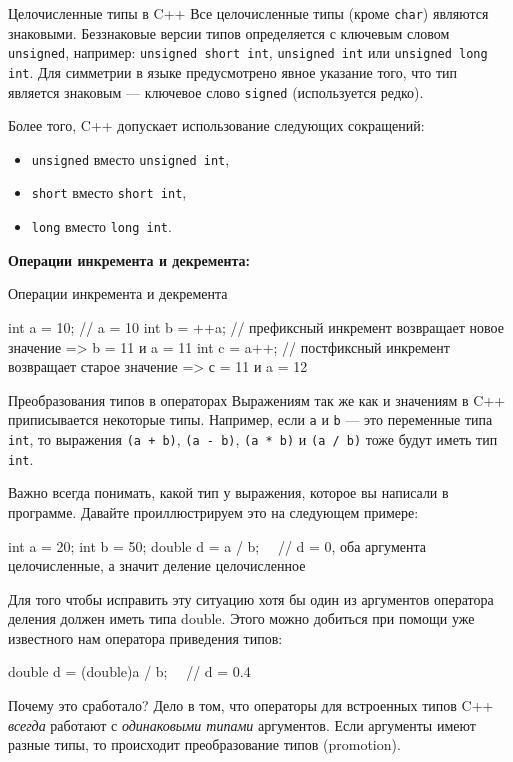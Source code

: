\documentclass[
    9pt,
    hyperref={pdfencoding=unicode}
    ]{beamer}
\begin{document}
\begin{frame}{Целочисленные типы в C++}
    Все целочисленные типы (кроме \texttt{char}) являются знаковыми. Беззнаковые версии типов определяется с ключевым словом \texttt{unsigned}, например: \texttt{unsigned short int}, \texttt{unsigned int} или \texttt{unsigned long int}. Для симметрии в языке предусмотрено явное указание того, что тип является знаковым — ключевое слово \texttt{signed} (используется редко).
    
    Более того, C++ допускает использование следующих сокращений:
    \begin{itemize}
        \item \texttt{unsigned} вместо \texttt{unsigned int},
        \item \texttt{short} вместо \texttt{short int},
        \item \texttt{long} вместо \texttt{long int}.
    \end{itemize}

    \textbf{Операции инкремента и декремента:}
\end{frame}

\begin{frame}[fragile]{Операции инкремента и декремента}
    \begin{cppcode}
        int a = 10; // a = 10
        int b = ++a; // префиксный инкремент возвращает новое значение => b = 11 и a = 11
        int c = a++; // постфиксный инкремент возвращает старое значение => с = 11 и a = 12
    \end{cppcode}
\end{frame}

\begin{frame}[fragile]{Преобразования типов в операторах}
    Выражениям так же как и значениям в C++ приписывается некоторые типы. Например, если \texttt{a} и \texttt{b} — это переменные типа \texttt{int}, то выражения \texttt{(a + b)}, \texttt{(a - b)}, \texttt{(a * b)} и \texttt{(a / b)} тоже будут иметь тип \texttt{int}.
    
    Важно всегда понимать, какой тип у выражения, которое вы написали в программе. Давайте проиллюстрируем это на следующем примере:
    
    \begin{cppcode}
        int a = 20;
        int b = 50;
        double d = a / b;  // d = 0, оба аргумента целочисленные, а значит деление целочисленное 
    \end{cppcode}

    Для того чтобы исправить эту ситуацию хотя бы один из аргументов оператора деления должен иметь типа double. Этого можно добиться при помощи уже известного нам оператора приведения типов:
    \begin{cppcode}
        double d = (double)a / b;  // d = 0.4
    \end{cppcode}

    Почему это сработало? Дело в том, что операторы для встроенных типов C++ \emph{всегда} работают с \emph{одинаковыми типами} аргументов. Если аргументы имеют разные типы, то происходит преобразование типов (promotion).
\end{frame}
\end{document}
